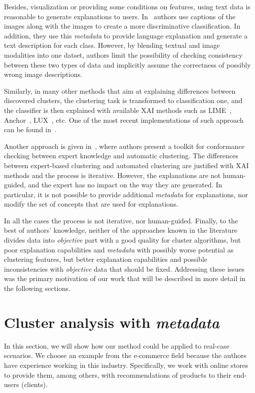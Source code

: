 \documentclass[
 twocolumn,
 hf,
]{ceurart}
\begin{document}
Besides, visualization or providing some conditions on features, using text data is reasonable to generate explanations to users.
In~\cite{hendricks2016generating} authors use captions of the images along with the images to create a more discriminative classification. 
In addition, they use this \textit{metadata} to provide language explanation and generate a text description for each class.
However, by blending textual and image modalities into one datset, authors limit the possibility of checking consistency between these two types of data and implicitly assume the correctness of possibly wrong image descriptions.

Similarly, in many other methods that aim at explaining differences between discovered clusters, the clustering task is transformed to classification one, and the classifier is then explained with available XAI methods such as LIME~\cite{lime}, Anchor~\cite{anchor}, LUX~\cite{lux2021iccs}, etc.
One of the most recent implementations of such approach can be found in~\cite{xaiclust2021}.

Another approach is given in~\cite{knac2021arxiv}, where authors present a toolkit for conformance checking between expert knowledge and automatic clustering.
The differences between expert-based clustering and automated clustering are justified with XAI methods and the process is iterative.
However, the explanations are not human-guided, and the expert has no impact on the way they are generated.
In particular, it is not possible to provide additional \textit{metadata} for explanations, nor modify the set of concepts that are used for explanations.

In all the cases the process is not iterative, nor human-guided.
Finally, to the best of authors' knowledge, neither of the approaches known in the literature divides data into \textit{objective} part with a good quality for cluster algorithms, but poor explanation capabilities and \textit{metadata} with possibly worse potential as clustering features, but better explanation capabilities and possible inconsistencies with \textit{objective} data that should be fixed.
Addressing these issues was the primary motivation of our work that will be described in more detail in the following sections.

\section{Cluster analysis with \textit{metadata}}
\label{sec:clumeta}
In this section, we will show how our method could be applied to real-case scenarios.
We choose an example from the e-commerce field because the authors have experience working in this industry.
Specifically, we work with online stores to provide them, among others, with recommendations of products to their end-users (clients).
\end{document}
